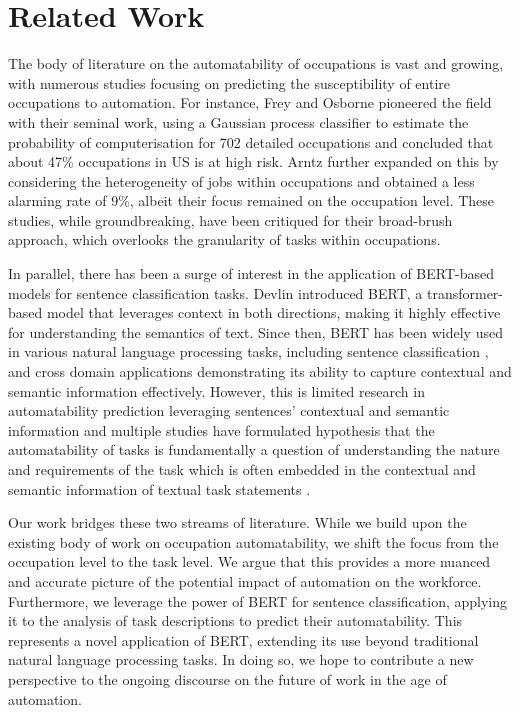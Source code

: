 \section{Related Work}
The body of literature on the automatability of occupations is vast and growing, with numerous studies focusing on predicting the susceptibility of entire occupations to automation. For instance, Frey and Osborne \cite{freyosborne} pioneered the field with their seminal work, using a Gaussian process classifier to estimate the probability of computerisation for 702 detailed occupations and concluded that about 47\% occupations in US is at high risk. Arntz \cite{arntz} further expanded on this by considering the heterogeneity of jobs within occupations and obtained a less alarming rate of 9\%, albeit their focus remained on the occupation level. These studies, while groundbreaking, have been critiqued for their broad-brush approach, which overlooks the granularity of tasks within occupations.\par

In parallel, there has been a surge of interest in the application of BERT-based models for sentence classification tasks. Devlin \cite{devlin2018bert} introduced BERT, a transformer-based model that leverages context in both directions, making it highly effective for understanding the semantics of text. Since then, BERT has been widely used in various natural language processing tasks, including sentence classification \cite{croce2020ganbert, lu2020vgcnbert}, and cross domain applications \cite{lavi2021consultantbert, xue2019finetuning} demonstrating its ability to capture contextual and semantic information effectively. However, this is limited research in automatability prediction leveraging sentences' contextual and semantic information and multiple studies have formulated hypothesis that the automatability of tasks is fundamentally a question of understanding the nature and requirements of the task which is often embedded in the contextual and semantic information of textual task statements \cite{towards, webb_2019_the}.\par

Our work bridges these two streams of literature. While we build upon the existing body of work on occupation automatability, we shift the focus from the occupation level to the task level. We argue that this provides a more nuanced and accurate picture of the potential impact of automation on the workforce. Furthermore, we leverage the power of BERT for sentence classification, applying it to the analysis of task descriptions to predict their automatability. This represents a novel application of BERT, extending its use beyond traditional natural language processing tasks. In doing so, we hope to contribute a new perspective to the ongoing discourse on the future of work in the age of automation.\par